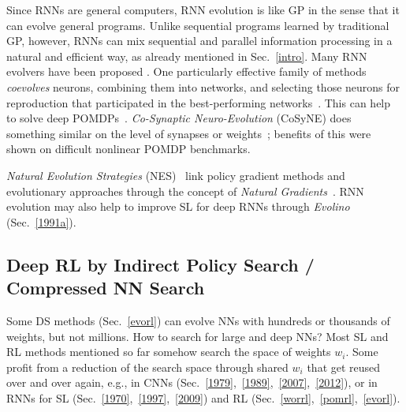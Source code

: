 \documentclass[letterpaper]{article}
\begin{document}
\begin{CJK*}{UTF8}{gbsn}
\begin{sloppypar}
Since RNNs are general computers, 
RNN evolution is like GP in the sense that it can evolve general programs.
Unlike sequential programs learned by traditional GP, however, RNNs can mix sequential and parallel information processing in a natural and efficient way, as already 
mentioned in Sec.~\ref{intro}. Many RNN evolvers have been proposed \citep[e.g.,][]{miller:icga89,wieland1991,cliff1993,yao:review93,nolfi:alife4,Sims:1994:EVC,yamauchi94sequential,miglino95evolving,moriarty:phd,pasemann99,juang2004,whiteson2012}.
One particularly effective  family of methods {\em coevolves} neurons, combining them into networks, and
selecting those neurons for reproduction that participated in the best-performing
networks~\citep{moriarty:ml96,gomez:phd,Gomez:03}. This
can help to solve deep POMDPs~\citep{Gomez:05gecco}.
{\em Co-Synaptic Neuro-Evolution} (CoSyNE) does something similar on the level of synapses or weights~\citep{Gomez:08jmlr};
benefits of this were shown on difficult nonlinear POMDP benchmarks.

{\em Natural Evolution Strategies} (NES)~\citep{wierstraCEC08,glasmachers:2010b,Sun2009a,sun:gecco13} link policy
gradient methods and evolutionary approaches through the concept of {\em Natural Gradients}~\citep{amari1998natural}.
RNN evolution may also help to improve SL for deep RNNs 
through {\em Evolino}~\citep{Schmidhuber:07nc} (Sec.~\ref{1991a}).


\subsection{Deep RL by Indirect Policy Search / Compressed NN Search}
\label{comrl}

Some DS methods (Sec.~\ref{evorl}) can evolve NNs  
with hundreds or thousands of weights, but not millions. 
How to search for large and deep NNs? 
Most SL and RL methods mentioned so far somehow search the space of weights $w_i$. 
Some profit from a reduction of the search space through shared $w_i$ 
that get reused over and over again, e.g., in CNNs (Sec.~\ref{1979},~\ref{1989},~\ref{2007},~\ref{2012}),
or in RNNs for SL (Sec.~\ref{1970},~\ref{1997},~\ref{2009}) and RL (Sec.~\ref{worrl},~\ref{pomrl},~\ref{evorl}).


\end{sloppypar}
\end{CJK*}
\end{document}
